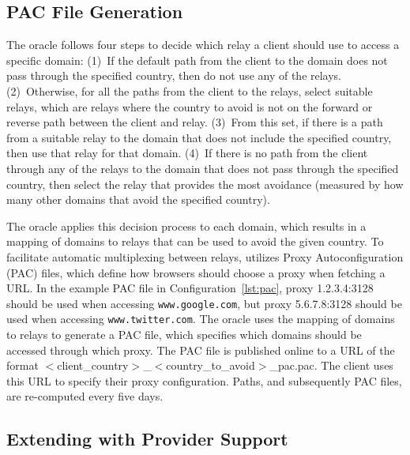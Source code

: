 \subsection{PAC File Generation}
\label{multiplex}
The oracle follows four steps to decide which relay a client should
use to access a specific domain: (1)~If the default path from the
client to the domain does not pass through the specified country, then
do not use any of the relays.  (2)~Otherwise, for all the paths from
the client to the relays, select suitable relays, which are relays where the country 
to avoid is not on the forward or reverse path between the client and 
relay.  (3)~From this set, if there
is a path from a suitable relay to the domain that does not include
the specified country, then use that relay for that domain.  (4)~If
there is no path from the client through any of the relays to the
domain that does not pass through the specified country, then select
the relay that provides the most avoidance (measured by how many other
domains that avoid the specified country).
\begin{figure}[t]
\centering
\resizebox{.4\textwidth}{!}{
\renewcommand{\lstlistingname}{Configuration}

\vspace*{-0.25in}
}
\end{figure}
The oracle applies this decision process to each domain, which results
in a mapping of domains to relays that can be used to avoid the given
country.  To facilitate automatic multiplexing between relays,
\system{} utilizes Proxy Autoconfiguration (PAC) files, which define
how browsers should choose a proxy when fetching a URL.  In the
example PAC file in Configuration~\ref{lst:pac}, proxy 1.2.3.4:3128
should be used when accessing {\tt www.google.com}, but proxy
5.6.7.8:3128 should be used when accessing {\tt www.twitter.com}.  The
oracle uses the mapping of domains to relays to generate a PAC file,
which specifies which domains should be accessed through which proxy.
The PAC file is published online to a URL of the format
$<$client\_country$>$\_$<$country\_to\_avoid$>$\_pac.pac.  The client
uses this URL to specify their proxy configuration.  Paths, and subsequently PAC files, are
re-computed every five days.

\subsection{Extending \system{} with Provider Support}

